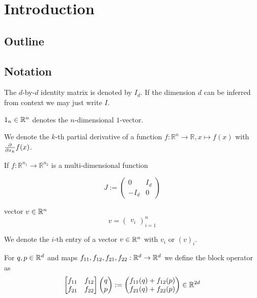 \documentclass[twoside,a4paper]{article}
\begin{document}
\section{Introduction}

\subsection{Outline}

\subsection{Notation}

The $d$-by-$d$ identity matrix is denoted by $I_d$. If the dimension $d$ can be inferred
from context we may just write $I$.

$1_{n} \in \mathbb{R}^n$ denotes the $n$-dimensional $1$-vector.

We denote the $k$-th partial derivative of a function $f: \mathbb{R}^n \to \mathbb{R},
x \mapsto f(x)$ with $\frac{\partial }{\partial x_k} f(x)$.

If $f: \mathbb{R}^{n_1} \to \mathbb{R}^{n_2}$ is a multi-dimensional function




\begin{equation*}
	J := \begin{pmatrix}
		0 & I_d \\
		-I_d & 0
	\end{pmatrix}
\end{equation*}

vector $v \in \mathbb{R}^n$
\begin{equation*}
	v = \begin{pmatrix}
		v_i
	\end{pmatrix}_{i=1}^n
\end{equation*}

We denote the $i$-th entry of a vector $v \in \mathbb{R}^n$ with $v_i$ or $(v)_i$.

For $q,p \in \mathbb{R}^{d}$ and maps $f_{11}, f_{12}, f_{21}, f_{22} : \mathbb{R}^d \to \mathbb{R}^d$
we define the block operator as
\begin{equation*}
	\begin{bmatrix}
		f_{11} & f_{12} \\
		f_{21} & f_{22}
	\end{bmatrix}
	\begin{pmatrix} q \\ p \end{pmatrix}
	:= \begin{pmatrix}
		f_{11}(q) + f_{12}(p) \\
		f_{21}(q) + f_{22}(p)
	\end{pmatrix} \in \mathbb{R}^{2d}
\end{equation*}
\end{document}
